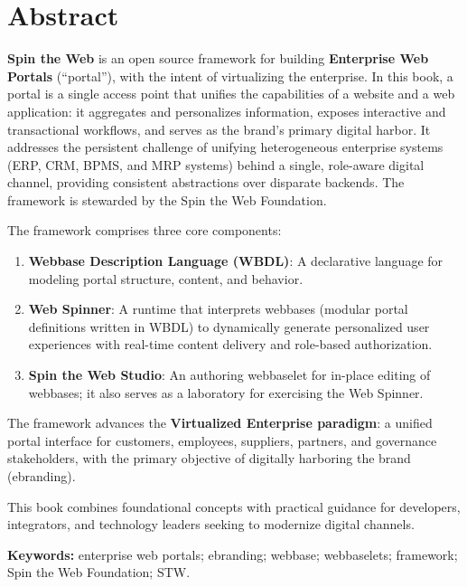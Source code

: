 
\chapter*{Abstract}
\textbf{Spin the Web} is an open source framework for building \textbf{Enterprise Web Portals} (``\gls{portal}''), with the intent of virtualizing the enterprise. In this book, a portal is a single access point that unifies the capabilities of a website and a web application: it aggregates and personalizes information, exposes interactive and transactional workflows, and serves as the brand's primary digital harbor. It addresses the persistent challenge of unifying heterogeneous enterprise systems (ERP, CRM, BPMS, and MRP systems) behind a single, role-aware digital channel, providing consistent abstractions over disparate backends. The framework is stewarded by the Spin the Web Foundation.

The framework comprises three core components:
\begin{enumerate}
\item \textbf{Webbase Description Language (WBDL)}: A declarative language for modeling portal structure, content, and behavior.
\item \textbf{Web Spinner}: A runtime that interprets webbases (modular portal definitions written in WBDL) to dynamically generate personalized user experiences with real-time content delivery and role-based authorization.
\item \textbf{Spin the Web Studio}: An authoring webbaselet for in-place editing of webbases; it also serves as a laboratory for exercising the Web Spinner.
\end{enumerate}

The framework advances the \textbf{Virtualized Enterprise paradigm}: a unified portal interface for customers, employees, suppliers, partners, and governance stakeholders, with the primary objective of digitally harboring the brand (\gls{ebranding}).

This book combines foundational concepts with practical guidance for developers, integrators, and technology leaders seeking to modernize digital channels.

\textbf{Keywords:} enterprise web portals; ebranding; webbase; webbaselets; framework; Spin the Web Foundation; STW.

\clearpage
